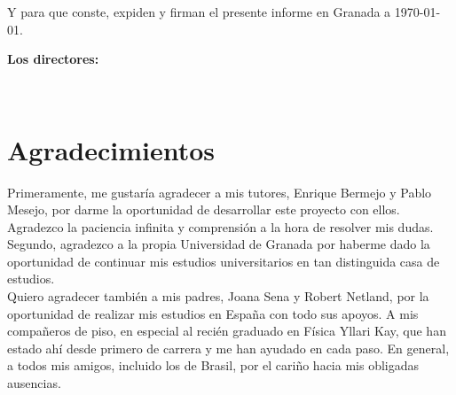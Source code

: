 Y para que conste, expiden y firman el presente informe en Granada a \today.

\vspace{1cm}

\textbf{Los directores:}

\vspace{5cm}

\noindent \textbf{\myProf \ \ \ \ \ \myOtherProf}

\chapter*{Agradecimientos}

\thispagestyle{empty}
       \vspace{1cm}


Primeramente, me gustaría agradecer a mis tutores, Enrique Bermejo y Pablo Mesejo,
por darme la oportunidad de desarrollar este proyecto con ellos. 
Agradezco la paciencia infinita y comprensión a la hora de resolver mis dudas. 
Segundo, agradezco a la propia Universidad de Granada por haberme dado la oportunidad 
de continuar mis estudios universitarios en tan distinguida casa de estudios. 
\\

Quiero agradecer también a mis padres, Joana Sena y Robert Netland, por la oportunidad 
de realizar mis estudios en España con todo sus apoyos. A mis compañeros de piso,
en especial al recién graduado en Física Yllari Kay, que han estado ahí desde 
primero de carrera y me han ayudado en cada paso. En general, a todos mis amigos, incluido los de Brasil,
por el cariño hacia mis obligadas ausencias. 
